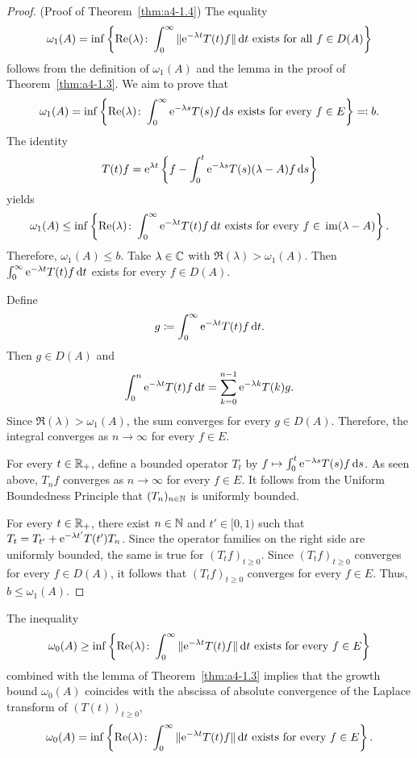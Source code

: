 \begin{proof}(Proof of Theorem~\ref{thm:a4-1.4}) 
The equality 
 \[ 
 \omega_1(A) = \inf \left\{ \mathop{}\!\mathrm{Re}(\lambda)\colon\int_0^\infty \|\mathrm{e}^{-\lambda t} T(t) f \|  \mathop{}\!\mathrm{d}{t} \text{ exists for all } f \in D(A) \right\} 
 \] 
 follows from the definition of\/ $\omega_1(A)$ and the lemma in the proof of Theorem~\ref{thm:a4-1.3}.
We aim to prove that
\[
\omega_1(A) = \inf \left\{ \mathop{}\!\mathrm{Re}(\lambda)\colon\int_0^\infty \mathrm{e}^{-\lambda s} T(s) f  \mathop{}\!\mathrm{d}{s} \text{ exists for every } f \in E \right\} \eqqcolon  b. 
\]
The identity
\[
    T(t) f = \mathrm{e}^{\lambda t} \left\{ f - \int_0^{t} \mathrm{e}^{-\lambda s} T(s) (\lambda - A) f  \mathop{}\!\mathrm{d}{s} \right\}
\]
yields
\[
\omega_1(A) \leq \inf \left\{ \Re(\lambda)\colon\int_0^\infty \eu^{-\lambda t} T(t) f  \dt \text{ exists for every } f \in \Image{\lambda - A} \right\}.
\]
Therefore, $\omega_1(A) \leq b$.
Take $\lambda \in \mathbb{C}$ with $\Re(\lambda) > \omega_1(A)$. 
Then $\int_0^\infty \mathrm{e}^{-\lambda t} T(t) f  \mathop{}\!\mathrm{d}{t}$ exists for every $f \in D(A)$. 

Define 
%
\[
	g \coloneq  \int_0^\infty \mathrm{e}^{-\lambda t} T(t) f  \mathop{}\!\mathrm{d}{t} .
\]
%
Then $g \in D(A)$ and
%
\[
	 \int_0^n \mathrm{e}^{-\lambda t} T(t) f  \mathop{}\!\mathrm{d}{t} = \sum_{k=0}^{n-1} \mathrm{e}^{-\lambda k} T(k) g .
\]
%
Since $\Re(\lambda) > \omega_1(A)$, the sum converges for every $g \in D(A)$. 
Therefore, the integral converges as $n \to \infty$ for every $f \in E$.

For every $t \in \mathbb{R}_+$, define a bounded operator $T_t$ by $ f \mapsto \int_0^t \mathrm{e}^{-\lambda s} T(s) f  \mathop{}\!\mathrm{d}{s}$. 
As seen above, $T_n f$ converges as $n \to \infty$ for every $f \in E$. 
It follows from the Uniform Boundedness Principle that $(T_n)_{n \in \mathbb{N}}$ is uniformly bounded.

For every $t \in \mathbb{R}_+$, there exist $n \in \mathbb{N}$ and $t' \in [0,1)$ such that $T_t = T_{t'} + \mathrm{e}^{-\lambda t'} T(t') T_n$. 
Since the operator families on the right side are uniformly bounded, the same is true for $(T_t f)_{t \geq 0}$. 
Since $(T_t f)_{t \geq 0}$ converges for every $f \in D(A)$, it follows that $(T_t f)_{t \geq 0}$ converges for every $f \in E$. 
Thus, $b \leq \omega_1(A)$.
\end{proof}
%


The inequality
\[
    \omega_{0}(A) \geq \inf \left\{ \Re(\lambda)\colon\int_0^\infty \|\eu^{-\lambda t} T(t) f \|  \dt 
    \text{ exists for every } f \in E \right\}
\]
combined with the lemma of Theorem~\ref{thm:a4-1.3} implies that the growth bound $\omega_{0}(A)$ coincides with the abscissa of absolute convergence of the Laplace transform of\/ $(T(t))_{t \geq 0}$, \ie
\begin{equation}\label{eq:a4-1.6}
   \omega_{0}(A) = \inf \left\{ \mathop{}\!\mathrm{Re}  (\lambda)\colon\int_0^\infty \|\mathrm{e}^{-\lambda t} T(t) f \|  \mathop{}\!\mathrm{d}{t} \text{ exists for every } f \in E \right\}.
\end{equation}
%


